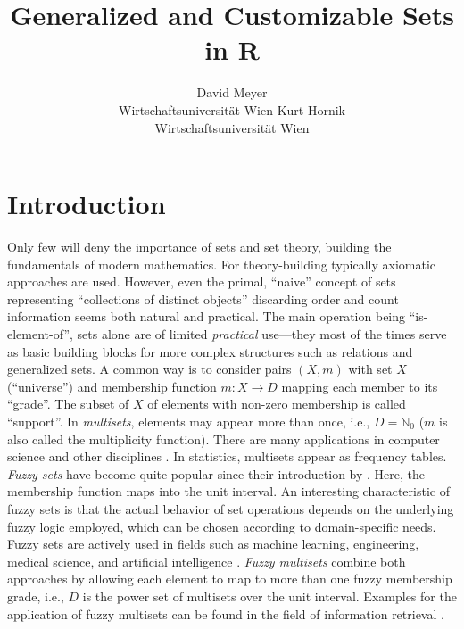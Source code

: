 \documentclass[article]{jss}
\author{David Meyer\\Wirtschaftsuniversit{\"a}t Wien \And
        Kurt Hornik\\Wirtschaftsuniversit{\"a}t Wien}
\title{Generalized and Customizable Sets in {\sf R}}
\begin{document}

\section[Introduction]{Introduction}

Only few will deny the importance of sets and set theory, building the
fundamentals of modern mathematics. For theory-building typically
axiomatic approaches \citep[e.g.,][]{sets:zermelo:1908, sets:fraenkel:1922}
are used. However, even
the primal, ``naive'' concept of sets representing ``collections
of distinct objects'' \citep{sets:cantor:1895} discarding order
and count information seems both natural and practical.
The main operation being ``is-element-of'', sets alone are of limited
\emph{practical} use---they most of the times serve as basic building blocks for
more complex structures such as relations and generalized sets. A
common way is to consider pairs $(X, m)$ with set $X$ (``universe'')
and membership function
$m : X \rightarrow D$ mapping each member to its ``grade''. The subset
of $X$ of elements with non-zero membership is called ``support''.
In \emph{multisets}, elements may appear more than once, i.e., $D =
\mathbb{N}_0$ ($m$ is also called the multiplicity function). There are many
applications in computer science and other disciplines
\citep[for a survey, see, e.g.,][]{sets:singh+ibrahim+yohanna:2007}.
In statistics, multisets appear as frequency tables. \emph{Fuzzy sets}
have become quite popular since their introduction by
\cite{sets:zadeh:1965}. Here, the membership function maps into the
unit interval. An interesting characteristic of fuzzy sets is that
the actual behavior of set operations depends on the underlying
fuzzy logic employed, which can be chosen according to domain-specific
needs. Fuzzy sets are actively used in fields such as machine
learning, engineering, medical science, and artificial intelligence
\citep{sets:dubois+prade+yager:1996}.
\emph{Fuzzy multisets} \citep{sets:yager:1986}
combine both approaches by allowing
each element to map to more than one fuzzy membership grade, i.e., $D$ is
the power set of multisets over the unit interval. Examples for the
application of fuzzy multisets can be found in the field of information
retrieval \citep[e.g.,][]{sets:matthe+caluwe+tre:2006}.
\end{document}
